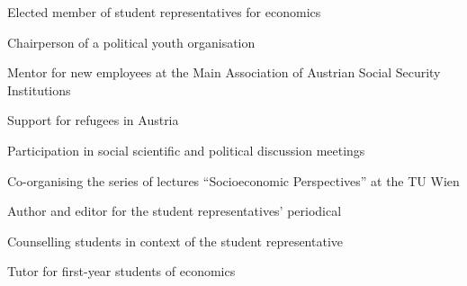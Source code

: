 

	{\begin{cvenumerate}
		\item Elected member of student representatives for economics
		\item Chairperson of a political youth organisation
	\end{cvenumerate}}

	{\begin{cvenumerate}
		\item Mentor for new employees at the Main Association of Austrian Social Security Institutions
		\item Support for refugees in Austria
		\item Participation in social scientific and political discussion meetings
	\end{cvenumerate}}

{\begin{cvenumerate}
		\item Co-organising the series of lectures ``Socioeconomic Perspectives'' at the TU Wien
		\item Author and editor for the student representatives' periodical
		\item Counselling students in context of the student representative
		\item Tutor for first-year students of economics
	\end{cvenumerate}}